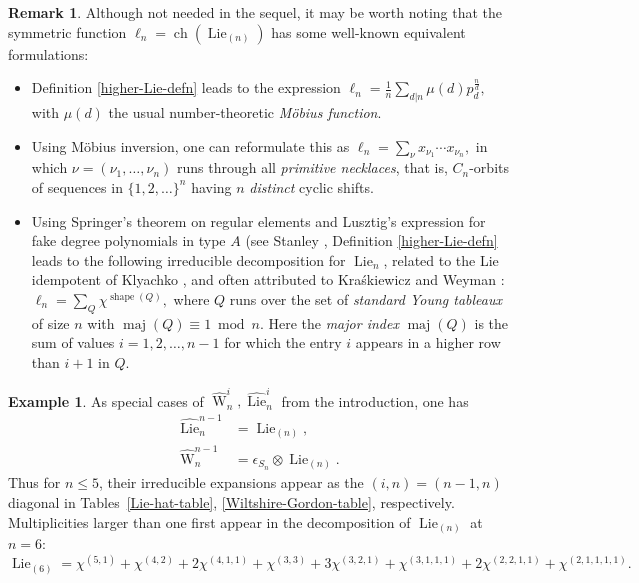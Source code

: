 \documentclass[12pt]{amsart}
\theoremstyle{plain}
\theoremstyle{definition}
\newtheorem{remark}[thm]{Remark}
\newtheorem{ex}[thm]{Example}
\begin{document}
\begin{remark}
\label{necklace-and-maj-remark}
Although not needed in the sequel, it may be worth noting that
the symmetric function $\ell_n={{\operatorname{ch}}}({{\operatorname{Lie}}}_{(n)})$
has some well-known equivalent formulations:

\begin{itemize}

\item
Definition \eqref{higher-Lie-defn} leads to the expression
$
\ell_n
   = \frac{1}{n} \sum_{d | n} \mu(d) p_d^{\frac{n}{d}},
$
with $\mu(d)$ the usual number-theoretic {\it M\"obius function}.

\item 
Using M\"obius inversion, one can reformulate this as
$
\ell_n = \sum_{\nu} x_{\nu_1} \cdots x_{\nu_n},
$
in which $\nu=(\nu_1,\ldots,\nu_n)$ runs through all 
{\it primitive necklaces}, that is,
$C_n$-orbits of sequences in $\{1,2,\ldots\}^n$ having $n$ {\it distinct} 
cyclic shifts.

\item
Using Springer's theorem on regular
elements \cite[Prop. 4.5]{Springer} and Lusztig's expression
for fake degree polynomials in type $A$ (see Stanley \cite[Prop. 4.11]{Stanley-invariants}, Definition \eqref{higher-Lie-defn} 
leads to the following
irreducible decomposition for ${{\operatorname{Lie}}}_n$, related to the Lie idempotent
of Klyachko \cite{Klyachko}, and often attributed to Kra{\'s}kiewicz and Weyman \cite{KraskiewiczWeyman}:
$
\ell_n   
   = \sum_{Q} \chi^{{{\operatorname{shape}}}(Q)}, 
$
where $Q$ runs over the set of {\it standard Young tableaux} of size $n$ with
${{\operatorname{maj}}}(Q) \equiv 1 \bmod{n}$.  Here 
the {\it major index} ${{\operatorname{maj}}}(Q)$ is the sum of values $i=1,2,\ldots,n-1$
for which the entry $i$ appears in a higher row than $i+1$ in $Q$.
\end{itemize}

\end{remark}

\begin{ex}
As special cases of $\widehat{{\operatorname{W}}}^i_n, \widehat{{\operatorname{Lie}}}^i_n$
from the introduction, one has
$$
\begin{aligned}
\widehat{{\operatorname{Lie}}}^{n-1}_n &={{\operatorname{Lie}}}_{(n)},\\
\widehat{{\operatorname{W}}}^{n-1}_n &=\epsilon_{S_n} \otimes {{\operatorname{Lie}}}_{(n)}.
\end{aligned}
$$
Thus for $n \leq 5$, their irreducible
expansions appear as the $(i,n)=(n-1,n)$ diagonal 
in Tables~\eqref{Lie-hat-table}, \eqref{Wiltshire-Gordon-table},
respectively. Multiplicities larger than one first appear in the
decomposition of ${{\operatorname{Lie}}}_{(n)}$ at $n=6$:  
$$
{{\operatorname{Lie}}}_{(6)}=
\chi^{(5, 1)} + 
\chi^{(4, 2)} +
2\chi^{(4, 1, 1)} +
\chi^{(3,3)} +
3 \chi^{(3, 2, 1)} +
\chi^{(3, 1, 1, 1)} +
2\chi^{(2, 2, 1, 1)} +
\chi^{(2, 1, 1, 1, 1)}.
$$
\end{ex}
\end{document}
